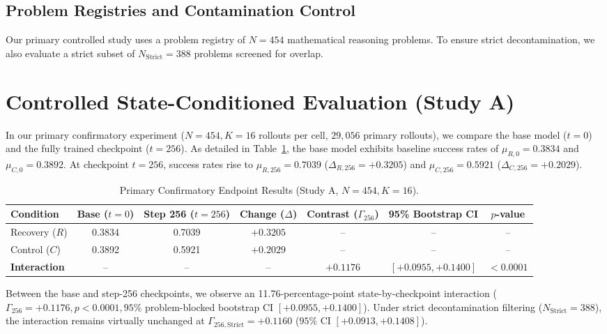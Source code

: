\documentclass[11pt,3p,review]{elsarticle}
\begin{document}
\subsection{Problem Registries and Contamination Control}
Our primary controlled study uses a problem registry of $N=454$ mathematical reasoning problems. To ensure strict decontamination, we also evaluate a strict subset of $N_{\text{Strict}}=388$ problems screened for overlap.

\section{Controlled State-Conditioned Evaluation (Study A)}
In our primary confirmatory experiment ($N=454, K=16$ rollouts per cell, $29,056$ primary rollouts), we compare the base model ($t=0$) and the fully trained checkpoint ($t=256$). As detailed in Table~\ref{tab:endpoint}, the base model exhibits baseline success rates of $\mu_{R,0} = 0.3834$ and $\mu_{C,0} = 0.3892$. At checkpoint $t=256$, success rates rise to $\mu_{R,256} = 0.7039$ ($\Delta_{R,256} = +0.3205$) and $\mu_{C,256} = 0.5921$ ($\Delta_{C,256} = +0.2029$).

\begin{table}[htbp]
\centering
\caption{Primary Confirmatory Endpoint Results (Study A, $N=454, K=16$).}
\label{tab:endpoint}
\begin{tabular}{lcccccc}
\toprule
Condition & Base ($t=0$) & Step 256 ($t=256$) & Change ($\Delta$) & Contrast ($\Gamma_{256}$) & 95\% Bootstrap CI & $p$-value \\
\midrule
Recovery ($R$) & 0.3834 & 0.7039 & $+0.3205$ & -- & -- & -- \\
Control ($C$)  & 0.3892 & 0.5921 & $+0.2029$ & -- & -- & -- \\
\midrule
\textbf{Interaction} & -- & -- & -- & \textbf{$+0.1176$} & \textbf{$[+0.0955, +0.1400]$} & \textbf{$<0.0001$} \\
\bottomrule
\end{tabular}
\end{table}

Between the base and step-256 checkpoints, we observe an 11.76-percentage-point state-by-checkpoint interaction ($\Gamma_{256} = \mathbf{+0.1176}, p < 0.0001, 95\%$ problem-blocked bootstrap CI $[+0.0955, +0.1400]$). Under strict decontamination filtering ($N_{\text{Strict}}=388$), the interaction remains virtually unchanged at $\Gamma_{256,\text{Strict}} = \mathbf{+0.1160}$ ($95\%$ CI $[+0.0913, +0.1408]$).
\end{document}
